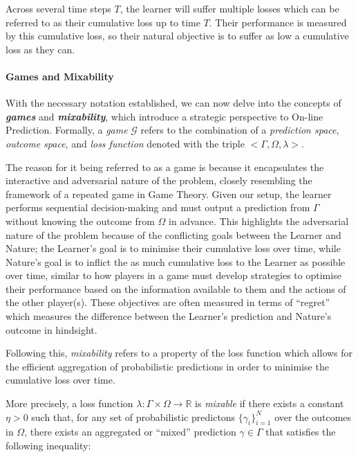 Across several time steps $T$, the learner will suffer multiple losses which can be referred to as their cumulative loss up to time $T$. Their performance is measured by this cumulative loss, so their natural objective is to suffer as low a cumulative loss as they can.

\paragraph{Games and Mixability}
With the necessary notation established, we can now delve into the concepts of \textbf{\textit{games}} and \textbf{\textit{mixability}}, which introduce a strategic perspective to On-line Prediction. Formally, a \textit{game} $\mathcal{G}$ refers to the combination of a \textit{prediction space}, \textit{outcome space}, and \textit{loss function} denoted with the triple $<\Gamma, \Omega, \lambda>$. 

The reason for it being referred to as a game is because it encapsulates the interactive and adversarial nature of the problem, closely resembling the framework of a repeated game in Game Theory. Given our setup, the learner performs sequential decision-making and must output a prediction from $\Gamma$ without knowing the outcome from $\Omega$ in advance. This highlights the adversarial nature of the problem because of the conflicting goals between the Learner and Nature; the Learner's goal is to minimise their cumulative loss over time, while Nature's goal is to inflict the as much cumulative loss to the Learner as possible over time, similar to how players in a game must develop strategies to optimise their performance based on the information available to them and the actions of the other player(s). These objectives are often measured in terms of ``regret'' which measures the difference between the Learner's prediction and Nature's outcome in hindsight.

Following this, \textit{mixability} refers to a property of the loss function which allows for the efficient aggregation of probabilistic predictions in order to minimise the cumulative loss over time.

More precisely, a loss function $\lambda : \Gamma \times \Omega \rightarrow \mathbb{R}$ is \textit{mixable} if there exists a constant $\eta > 0$ such that, for any set of probabilistic predictons $\{\gamma_i\}^N_{i=1}$ over the outcomes in $\Omega$, there exists an aggregated or ``mixed'' prediction $\gamma \in \Gamma$ that satisfies the following inequality:

